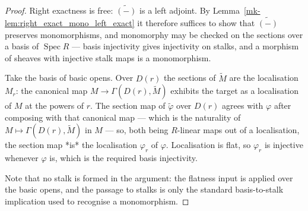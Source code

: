 \begin{proof}
  \leanok{}
  Right exactness is free: \(\widetilde{(-)}\) is a left adjoint. By
  Lemma~\ref{mk-lem:right_exact_mono_left_exact} it therefore suffices to show that
  \(\widetilde{(-)}\) preserves monomorphisms, and monomorphy may be checked on the sections
  over a basis of \(\operatorname{Spec} R\) --- basis injectivity gives injectivity on stalks,
  and a morphism of sheaves with injective stalk maps is a monomorphism.

  Take the basis of basic opens. Over \(D(r)\) the sections of \(\widetilde{M}\) are the
  localisation \(M_r\): the canonical map \(M \to \Gamma(D(r), \widetilde{M})\) exhibits the
  target as a localisation of \(M\) at the powers of \(r\). The section map of
  \(\widetilde{\varphi}\) over \(D(r)\) agrees with \(\varphi\) after composing with that
  canonical map --- which is the naturality of \(M \mapsto \Gamma(D(r), \widetilde{M})\) in
  \(M\) --- so, both being \(R\)-linear maps out of a localisation, the section map *is* the
  localisation \(\varphi_r\) of \(\varphi\). Localisation is flat, so \(\varphi_r\) is injective
  whenever \(\varphi\) is, which is the required basis injectivity.

  Note that no stalk is formed in the argument: the flatness input is applied over the basic
  opens, and the passage to stalks is only the standard basis-to-stalk implication used to
  recognise a monomorphism.
\end{proof}
